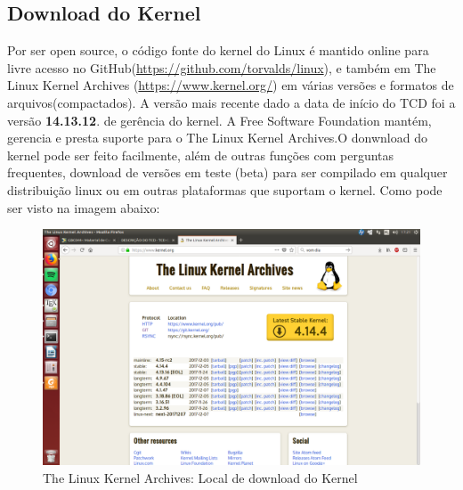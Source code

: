 \documentclass[12pt]{article}
\begin{document}
\subsection{Download do Kernel}
Por ser open source, o código fonte do kernel do Linux é mantido online para livre acesso no GitHub(\url{https://github.com/torvalds/linux}), e também em The Linux Kernel Archives (\url{https://www.kernel.org/}) em várias versões e formatos de arquivos(compactados). A versão mais recente dado a data de início do TCD foi a versão \textbf{14.13.12}.
de gerência do kernel.
	A Free Software Foundation mantém, gerencia e presta suporte para o The Linux Kernel Archives.O donwnload do kernel pode ser feito facilmente, além de outras funções com perguntas frequentes, download de versões em teste (beta) para ser compilado em qualquer distribuição linux ou em outras plataformas que suportam o kernel.
	\vspace*{2cm}
	 Como pode ser visto na imagem abaixo:
\begin{figure}[!h]
	\centering
	\includegraphics[scale=0.2]{imagens/kernelorg.png}
	\caption{The Linux Kernel Archives: Local de download do Kernel}
	\label{kernelorg}
\end{figure}
\end{document}
